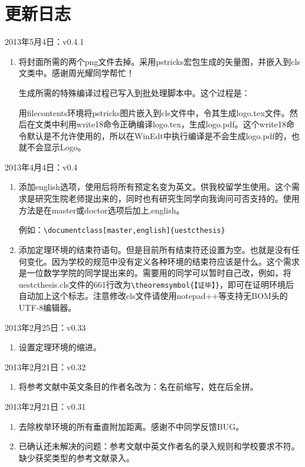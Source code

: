 
\chapter{更新日志}
\noindent
2013年5月4日：v0.4.1
\begin{enumerate}
\item 将封面所需的两个png文件去掉。采用pstricks宏包生成的矢量图，并嵌入到cls文类中。感谢周光耀同学帮忙！

生成所需的特殊编译过程已写入到批处理脚本中。这个过程是：

用filecontents环境将pstricks图片嵌入到cls文件中，令其生成logo.tex文件。然后在文类中利用write18命令正确编译logo.tex，生成logo.pdf。这个write18命令默认是不允许使用的，所以在WinEdt中执行编译是不会生成logo.pdf的，也就不会显示Logo。

\end{enumerate}

\noindent
2013年4月4日：v0.4
\begin{enumerate}
\item 添加english选项，使用后将所有预定名变为英文。供我校留学生使用。这个需求是研究生院老师提出来的，同时也有研究生同学向我询问可否支持的。使用方法是在master或doctor选项后加上,english。

    例如：\verb|\documentclass[master,english]{uestcthesis}|
\item 添加定理环境的结束符语句。但是目前所有结束符还设置为空。也就是没有任何变化。因为学校的规范中没有定义各种环境的结束符应该是什么。这个需求是一位数学学院的同学提出来的。需要用的同学可以暂时自己改，例如，将uestcthesis.cls文件的661行改为\verb|\theoremsymbol{【证毕】}|，即可在证明环境后自动加上这个标志。注意修改cls文件请使用notepad++等支持无BOM头的UTF-8编辑器。
\end{enumerate}

\noindent
2013年2月25日：v0.33
\begin{enumerate}
\item 设置定理环境的缩进。
\end{enumerate}


\noindent
2013年2月21日：v0.32
\begin{enumerate}
\item 将参考文献中英文条目的作者名改为：名在前缩写，姓在后全拼。
\end{enumerate}

\noindent
2013年2月21日：v0.31
\begin{enumerate}
\item 去除枚举环境的所有垂直附加距离。感谢不中同学反馈BUG。
\item 已确认还未解决的问题：参考文献中英文作者名的录入规则和学校要求不符。缺少获奖类型的参考文献录入。
\end{enumerate}

